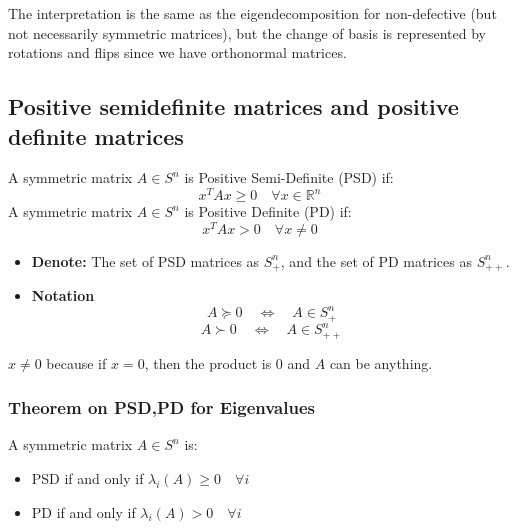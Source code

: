 \begin{warning}
    The interpretation is the same as the eigendecomposition for non-defective (but not necessarily symmetric matrices), but the change of basis is represented by rotations and flips since we have orthonormal matrices. 
\end{warning}

\subsection{Positive semidefinite matrices and positive definite matrices}
\begin{definition}
    A symmetric matrix \( A \in S^n \) is Positive Semi-Definite (PSD) if:
    \[
    x^T A x \geq 0 \quad \forall x \in \mathbb{R}^n
    \]
    A symmetric matrix \( A \in S^n \) is Positive Definite (PD) if:
    \[
    x^T A x > 0 \quad \forall x \neq 0
    \]

    \begin{itemize}
        \item \textbf{Denote:} The set of PSD matrices as \( S^n_+ \), and the set of PD matrices as \( S^n_{++} \). 
        \item \textbf{Notation} 
        \[
        A \succeq 0 \quad \Leftrightarrow \quad A \in S^n_+
        \]
        \[
        A \succ 0 \quad \Leftrightarrow \quad A \in S^n_{++}
        \]
    \end{itemize}
\end{definition}

\begin{warning}
    $x \neq 0$ because if $x=0$, then the product is $0$ and $A$ can be anything. 
\end{warning}

\subsubsection{Theorem on PSD,PD for Eigenvalues}
\begin{theorem}
    A symmetric matrix \( A \in S^n \) is:
    \begin{itemize}
        \item PSD if and only if \( \lambda_i(A) \geq 0 \quad \forall i \)
        \item PD if and only if \( \lambda_i(A) > 0 \quad \forall i \)
    \end{itemize}
\end{theorem}

